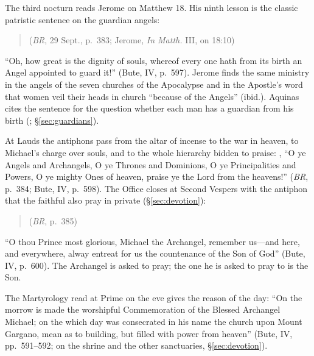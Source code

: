 The third nocturn reads Jerome on Matthew 18. His ninth lesson is the
classic patristic sentence on the guardian angels:
\begin{quote}
 (\emph{BR}, 29 Sept., p.~383;
Jerome, \emph{In Matth.} III, on 18:10)
\end{quote}
``Oh, how great is the dignity of souls, whereof every one hath from its
birth an Angel appointed to guard it!'' (Bute, IV, p.~597). Jerome finds
the same ministry in the angels of the seven churches of the Apocalypse
and in the Apostle's word that women veil their heads in church ``because
of the Angels'' (ibid.). Aquinas cites the sentence for the question
whether each man has a guardian from his birth (;
\S\ref{sec:guardians}).

At Lauds the antiphons pass from the altar of incense to the war in
heaven, to Michael's charge over souls, and to the whole hierarchy
bidden to praise: ,
``O ye Angels and Archangels, O ye Thrones and Dominions, O ye
Principalities and Powers, O ye mighty Ones of heaven, praise ye the Lord
from the heavens!'' (\emph{BR}, p.~384; Bute, IV, p.~598). The Office
closes at Second Vespers with the antiphon that the faithful also pray in
private (\S\ref{sec:devotion}):
\begin{quote}
(\emph{BR}, p.~385)
\end{quote}
``O thou Prince most glorious, Michael the Archangel, remember us---and
here, and everywhere, alway entreat for us the countenance of the Son of
God'' (Bute, IV, p.~600). The Archangel is asked to pray; the one he is
asked to pray to is the Son.

The Martyrology read at Prime on the eve gives the reason of the day: ``On the morrow is made the worshipful Commemoration of
the Blessed Archangel Michael; on the which day was consecrated in his
name the church upon Mount Gargano, mean as to building, but filled with
power from heaven'' (Bute, IV, pp.~591--592; on the shrine and the other sanctuaries,
\S\ref{sec:devotion}).


